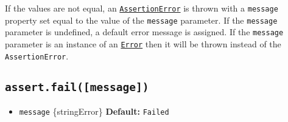 \begin{Shaded}
\begin{Highlighting}[]
\OperatorTok{=} \NormalTok{(}\NormalTok{)}\OperatorTok{;}

\NormalTok{(}\OperatorTok{,} \NormalTok{)}\OperatorTok{;}
\NormalTok{(}\OperatorTok{,} \StringTok{\textquotesingle{}1\textquotesingle{}}\NormalTok{)}\OperatorTok{;}
\NormalTok{(}\OperatorTok{,} \NormalTok{)}\OperatorTok{;}

\NormalTok{(}\OperatorTok{,} \NormalTok{)}\OperatorTok{;}
\NormalTok{(\{ }\OperatorTok{:}\NormalTok{ \{ }\OperatorTok{:} \NormalTok{ \} \}}\OperatorTok{,}\NormalTok{ \{ }\OperatorTok{:}\NormalTok{ \{ }\OperatorTok{:} \NormalTok{ \} \})}\OperatorTok{;}
\end{Highlighting}
\end{Shaded}

If the values are not equal, an
\hyperref[class-assertassertionerror]{\texttt{AssertionError}} is thrown
with a \texttt{message} property set equal to the value of the
\texttt{message} parameter. If the \texttt{message} parameter is
undefined, a default error message is assigned. If the \texttt{message}
parameter is an instance of an
\href{errors.md\#class-error}{\texttt{Error}} then it will be thrown
instead of the \texttt{AssertionError}.

\subsection{\texorpdfstring{\texttt{assert.fail({[}message{]})}}{assert.fail({[}message{]})}}\label{assert.failmessage}

\begin{itemize}
\tightlist
\item
  \texttt{message} \{string\textbar Error\} \textbf{Default:}
  \texttt{\textquotesingle{}Failed\textquotesingle{}}
\end{itemize}

